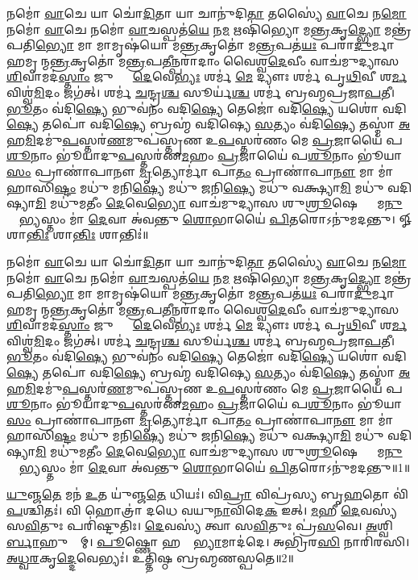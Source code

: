 \setcounter{anuvakam}{0}
𑌨𑌮𑍋॑ \ul{𑌵𑌾}𑌚𑍇 𑌯𑌾 𑌚𑍋॑\ul{𑌦𑌿}𑌤𑌾 𑌯𑌾 𑌚𑌾𑌨𑍁॑𑌦𑌿\ul{𑌤𑌾} 𑌤𑌸𑍍𑌯𑍈॑ \ul{𑌵𑌾}𑌚𑍇 𑌨\ul{𑌮𑍋} 𑌨𑌮𑍋॑ \ul{𑌵𑌾}𑌚𑍇 𑌨𑌮𑍋॑ \ul{𑌵𑌾}𑌚𑌸𑍍𑌪𑌤॑\ul{𑌯𑍇} 𑌨\ul{𑌮} 𑌋𑌷𑌿॑𑌭𑍍𑌯𑍋 𑌮\ul{𑌨𑍍𑌤𑍍𑌰}𑌕𑍃\ul{𑌦𑍍𑌭𑍍𑌯𑍋} 𑌮𑌨𑍍𑌤𑍍𑌰॑𑌪𑌤𑌿\ul{𑌭𑍍𑌯𑍋} 𑌮𑌾 𑌮𑌾𑌮𑍃𑌷॑𑌯𑍋 𑌮\ul{𑌨𑍍𑌤𑍍𑌰}𑌕𑍃𑌤𑍋॑ 𑌮\ul{𑌨𑍍𑌤𑍍𑌰}𑌪𑌤॑\ul{𑌯𑌃} 𑌪𑌰𑌾॑\ul{𑌦𑍁}𑌰𑍍𑌮𑌾𑌹𑌮𑍃𑌷𑍀᳚𑌨𑍍𑌮\ul{𑌨𑍍𑌤𑍍𑌰}𑌕𑍃𑌤𑍋॑ 𑌮\ul{𑌨𑍍𑌤𑍍𑌰}𑌪\ul{𑌤𑍀}𑌨𑍍𑌪𑌰𑌾॑𑌦𑌾𑌂 𑌵𑍈𑌶𑍍𑌵\ul{𑌦𑍇}𑌵𑍀𑌂 𑌵𑌾𑌚॑𑌮𑍁𑌦𑍍𑌯𑌾𑌸 \ul{𑌶𑌿}𑌵𑌾𑌮𑌦॑\ul{𑌸𑍍𑌤𑌾𑌂} 𑌜𑍁𑌷𑍍𑌟𑌾𑌂᳚ \ul{𑌦𑍇}𑌵𑍇\ul{𑌭𑍍𑌯𑌃} 𑌶𑌰𑍍𑌮॑ \ul{𑌮𑍇} 𑌦𑍍𑌯𑍗𑌃  𑌶𑌰𑍍𑌮॑ 𑌪𑍃\ul{𑌥𑌿}𑌵𑍀 𑌶\ul{𑌰𑍍𑌮} 𑌵𑌿𑌶𑍍𑌵॑\ul{𑌮𑌿}𑌦𑌂 𑌜𑌗॑𑌤𑍍। 
𑌶𑌰𑍍𑌮॑ \ul{𑌚}𑌨𑍍𑌦𑍍𑌰\ul{𑌶𑍍𑌚} 𑌸𑍂𑌰𑍍𑌯॑\ul{𑌶𑍍𑌚} 𑌶𑌰𑍍𑌮॑ 𑌬𑍍𑌰𑌹𑍍𑌮𑌪𑍍𑌰𑌜𑌾\ul{𑌪}𑌤𑍀। 
\ul{𑌭𑍂}𑌤𑌂 𑌵॑𑌦𑌿\ul{𑌷𑍍𑌯𑍇} 𑌭𑍁𑌵॑𑌨𑌂 𑌵𑌦𑌿\ul{𑌷𑍍𑌯𑍇} 𑌤𑍇𑌜𑍋॑ 𑌵𑌦𑌿\ul{𑌷𑍍𑌯𑍇} 𑌯𑌶𑍋॑ 𑌵𑌦𑌿\ul{𑌷𑍍𑌯𑍇} 𑌤𑌪𑍋॑ 𑌵𑌦𑌿\ul{𑌷𑍍𑌯𑍇} 𑌬𑍍𑌰𑌹𑍍𑌮॑ 𑌵𑌦𑌿𑌷𑍍𑌯𑍇 \ul{𑌸}𑌤𑍍𑌯𑌂 𑌵॑𑌦𑌿\ul{𑌷𑍍𑌯𑍇} 𑌤𑌸𑍍𑌮𑌾॑ \ul{𑌅}𑌹\ul{𑌮𑌿}𑌦𑌮𑍁॑\ul{𑌪}𑌸𑍍𑌤𑌰॑\ul{𑌣}𑌮𑍁𑌪॑𑌸𑍍𑌤𑍃𑌣 𑌉\ul{𑌪}𑌸𑍍𑌤𑌰॑𑌣𑌂 𑌮𑍇 \ul{𑌪𑍍𑌰}𑌜𑌾𑌯𑍈॑ 𑌪\ul{𑌶𑍂}𑌨𑌾𑌂 𑌭𑍂॑𑌯𑌾𑌦𑍁\ul{𑌪}𑌸𑍍𑌤𑌰॑𑌣\ul{𑌮}𑌹𑌂 \ul{𑌪𑍍𑌰}𑌜𑌾𑌯𑍈॑ 𑌪\ul{𑌶𑍂}𑌨𑌾𑌂 𑌭𑍂॑𑌯𑌾\ul{𑌸𑌂} 𑌪𑍍𑌰𑌾𑌣𑌾॑𑌪𑌾𑌨𑍗 \ul{𑌮𑍃}𑌤𑍍𑌯𑍋𑌰𑍍𑌮𑌾॑ 𑌪𑌾\ul{𑌤𑌂} 𑌪𑍍𑌰𑌾𑌣𑌾॑𑌪𑌾\ul{𑌨𑍗} 𑌮𑌾 𑌮𑌾॑ 𑌹𑌾𑌸𑌿\ul{𑌷𑍍𑌟𑌂} 𑌮𑌧𑍁॑ 𑌮𑌨𑌿\ul{𑌷𑍍𑌯𑍇} 𑌮𑌧𑍁॑ 𑌜𑌨𑌿\ul{𑌷𑍍𑌯𑍇} 𑌮𑌧𑍁॑ 𑌵𑌕𑍍𑌷𑍍𑌯𑌾\ul{𑌮𑌿} 𑌮𑌧𑍁॑ 𑌵𑌦𑌿𑌷𑍍𑌯𑌾\ul{𑌮𑌿} 𑌮𑌧𑍁॑𑌮𑌤𑍀𑌂 \ul{𑌦𑍇}𑌵𑍇\ul{𑌭𑍍𑌯𑍋} 𑌵𑌾𑌚॑𑌮𑍁𑌦𑍍𑌯𑌾𑌸 𑌶𑍁\ul{𑌶𑍍𑌰𑍂}𑌷𑍇𑌣𑍍𑌯𑌾𑌂᳚ 𑌮\ul{𑌨𑍁}𑌷𑍍𑌯𑍇᳚\ul{𑌭𑍍𑌯}𑌸𑍍𑌤𑌂 𑌮𑌾॑ \ul{𑌦𑍇}𑌵𑌾 𑌅॑𑌵𑌨𑍍𑌤𑍁 \ul{𑌶𑍋}𑌭𑌾𑌯𑍈॑ \ul{𑌪𑌿}𑌤𑌰𑍋𑌽𑌨𑍁॑𑌮𑌦𑌨𑍍𑌤𑍁। 
𑍐 𑌶𑌾\ul{𑌨𑍍𑌤𑌿𑌃} 𑌶𑌾\ul{𑌨𑍍𑌤𑌿𑌃} 𑌶𑌾𑌨𑍍𑌤𑌿𑌃॑॥ 

𑌨𑌮𑍋॑ \ul{𑌵𑌾}𑌚𑍇 𑌯𑌾 𑌚𑍋॑\ul{𑌦𑌿}𑌤𑌾 𑌯𑌾 𑌚𑌾𑌨𑍁॑𑌦𑌿\ul{𑌤𑌾} 𑌤𑌸𑍍𑌯𑍈॑ \ul{𑌵𑌾}𑌚𑍇 𑌨\ul{𑌮𑍋} 𑌨𑌮𑍋॑ \ul{𑌵𑌾}𑌚𑍇 𑌨𑌮𑍋॑ \ul{𑌵𑌾}𑌚𑌸𑍍𑌪𑌤॑\ul{𑌯𑍇} 𑌨\ul{𑌮} 𑌋𑌷𑌿॑𑌭𑍍𑌯𑍋 𑌮\ul{𑌨𑍍𑌤𑍍𑌰}𑌕𑍃\ul{𑌦𑍍𑌭𑍍𑌯𑍋} 𑌮𑌨𑍍𑌤𑍍𑌰॑𑌪𑌤𑌿\ul{𑌭𑍍𑌯𑍋} 𑌮𑌾 𑌮𑌾𑌮𑍃𑌷॑𑌯𑍋 𑌮\ul{𑌨𑍍𑌤𑍍𑌰}𑌕𑍃𑌤𑍋॑ 𑌮\ul{𑌨𑍍𑌤𑍍𑌰}𑌪𑌤॑\ul{𑌯𑌃} 𑌪𑌰𑌾॑\ul{𑌦𑍁}𑌰𑍍𑌮𑌾𑌹𑌮𑍃𑌷𑍀᳚𑌨𑍍𑌮\ul{𑌨𑍍𑌤𑍍𑌰}𑌕𑍃𑌤𑍋॑ 𑌮\ul{𑌨𑍍𑌤𑍍𑌰}𑌪\ul{𑌤𑍀}𑌨𑍍𑌪𑌰𑌾॑𑌦𑌾𑌂 𑌵𑍈𑌶𑍍𑌵\ul{𑌦𑍇}𑌵𑍀𑌂 𑌵𑌾𑌚॑𑌮𑍁𑌦𑍍𑌯𑌾𑌸 \ul{𑌶𑌿}𑌵𑌾𑌮𑌦॑\ul{𑌸𑍍𑌤𑌾𑌂} 𑌜𑍁𑌷𑍍𑌟𑌾𑌂᳚ \ul{𑌦𑍇}𑌵𑍇\ul{𑌭𑍍𑌯𑌃} 𑌶𑌰𑍍𑌮॑ \ul{𑌮𑍇} 𑌦𑍍𑌯𑍗𑌃  𑌶𑌰𑍍𑌮॑ 𑌪𑍃\ul{𑌥𑌿}𑌵𑍀 𑌶\ul{𑌰𑍍𑌮} 𑌵𑌿𑌶𑍍𑌵॑\ul{𑌮𑌿}𑌦𑌂 𑌜𑌗॑𑌤𑍍। 
𑌶𑌰𑍍𑌮॑ \ul{𑌚}𑌨𑍍𑌦𑍍𑌰\ul{𑌶𑍍𑌚} 𑌸𑍂𑌰𑍍𑌯॑\ul{𑌶𑍍𑌚} 𑌶𑌰𑍍𑌮॑ 𑌬𑍍𑌰𑌹𑍍𑌮𑌪𑍍𑌰𑌜𑌾\ul{𑌪}𑌤𑍀। 
\ul{𑌭𑍂}𑌤𑌂 𑌵॑𑌦𑌿\ul{𑌷𑍍𑌯𑍇} 𑌭𑍁𑌵॑𑌨𑌂 𑌵𑌦𑌿\ul{𑌷𑍍𑌯𑍇} 𑌤𑍇𑌜𑍋॑ 𑌵𑌦𑌿\ul{𑌷𑍍𑌯𑍇} 𑌯𑌶𑍋॑ 𑌵𑌦𑌿\ul{𑌷𑍍𑌯𑍇} 𑌤𑌪𑍋॑ 𑌵𑌦𑌿\ul{𑌷𑍍𑌯𑍇} 𑌬𑍍𑌰𑌹𑍍𑌮॑ 𑌵𑌦𑌿𑌷𑍍𑌯𑍇 \ul{𑌸}𑌤𑍍𑌯𑌂 𑌵॑𑌦𑌿\ul{𑌷𑍍𑌯𑍇} 𑌤𑌸𑍍𑌮𑌾॑ \ul{𑌅}𑌹\ul{𑌮𑌿}𑌦𑌮𑍁॑\ul{𑌪}𑌸𑍍𑌤𑌰॑\ul{𑌣}𑌮𑍁𑌪॑𑌸𑍍𑌤𑍃𑌣 𑌉\ul{𑌪}𑌸𑍍𑌤𑌰॑𑌣𑌂 𑌮𑍇 \ul{𑌪𑍍𑌰}𑌜𑌾𑌯𑍈॑ 𑌪\ul{𑌶𑍂}𑌨𑌾𑌂 𑌭𑍂॑𑌯𑌾𑌦𑍁\ul{𑌪}𑌸𑍍𑌤𑌰॑𑌣\ul{𑌮}𑌹𑌂 \ul{𑌪𑍍𑌰}𑌜𑌾𑌯𑍈॑ 𑌪\ul{𑌶𑍂}𑌨𑌾𑌂 𑌭𑍂॑𑌯𑌾\ul{𑌸𑌂} 𑌪𑍍𑌰𑌾𑌣𑌾॑𑌪𑌾𑌨𑍗 \ul{𑌮𑍃}𑌤𑍍𑌯𑍋𑌰𑍍𑌮𑌾॑ 𑌪𑌾\ul{𑌤𑌂} 𑌪𑍍𑌰𑌾𑌣𑌾॑𑌪𑌾\ul{𑌨𑍗} 𑌮𑌾 𑌮𑌾॑ 𑌹𑌾𑌸𑌿\ul{𑌷𑍍𑌟𑌂} 𑌮𑌧𑍁॑ 𑌮𑌨𑌿\ul{𑌷𑍍𑌯𑍇} 𑌮𑌧𑍁॑ 𑌜𑌨𑌿\ul{𑌷𑍍𑌯𑍇} 𑌮𑌧𑍁॑ 𑌵𑌕𑍍𑌷𑍍𑌯𑌾\ul{𑌮𑌿} 𑌮𑌧𑍁॑ 𑌵𑌦𑌿𑌷𑍍𑌯𑌾\ul{𑌮𑌿} 𑌮𑌧𑍁॑𑌮𑌤𑍀𑌂 \ul{𑌦𑍇}𑌵𑍇\ul{𑌭𑍍𑌯𑍋} 𑌵𑌾𑌚॑𑌮𑍁𑌦𑍍𑌯𑌾𑌸 𑌶𑍁\ul{𑌶𑍍𑌰𑍂}𑌷𑍇𑌣𑍍𑌯𑌾𑌂᳚ 𑌮\ul{𑌨𑍁}𑌷𑍍𑌯𑍇᳚\ul{𑌭𑍍𑌯}𑌸𑍍𑌤𑌂 𑌮𑌾॑ \ul{𑌦𑍇}𑌵𑌾 𑌅॑𑌵𑌨𑍍𑌤𑍁 \ul{𑌶𑍋}𑌭𑌾𑌯𑍈॑ \ul{𑌪𑌿}𑌤𑌰𑍋𑌽𑌨𑍁॑𑌮𑌦𑌨𑍍𑌤𑍁॥1॥\anuvakamend

\ul{𑌯𑍁}𑌞𑍍𑌜\ul{𑌤𑍇} 𑌮𑌨॑ \ul{𑌉}𑌤 𑌯𑍁॑𑌞𑍍𑌜\ul{𑌤𑍇} 𑌧𑌿𑌯𑌃॑। 
𑌵𑌿\ul{𑌪𑍍𑌰𑌾} 𑌵𑌿𑌪𑍍𑌰॑𑌸𑍍𑌯 𑌬𑍃\ul{𑌹}𑌤𑍋 𑌵𑌿॑\ul{𑌪}𑌶𑍍𑌚𑌿𑌤𑌃॑। 
𑌵𑌿 𑌹𑍋𑌤𑍍𑌰𑌾॑ 𑌦𑌧𑍇 𑌵𑌯𑍁\ul{𑌨𑌾}𑌵𑌿𑌦𑍇\ul{𑌕} 𑌇𑌤𑍍। 
\ul{𑌮}𑌹𑍀 \ul{𑌦𑍇}𑌵𑌸𑍍𑌯॑ 𑌸\ul{𑌵𑌿}𑌤𑍁𑌃 𑌪𑌰𑌿॑𑌷𑍍𑌟𑍁𑌤𑌿𑌃। 
\ul{𑌦𑍇}𑌵𑌸𑍍𑌯॑ 𑌤𑍍𑌵𑌾 𑌸\ul{𑌵𑌿}𑌤𑍁𑌃 𑌪𑍍𑌰॑\ul{𑌸}𑌵𑍇। 
\ul{𑌅}𑌶𑍍𑌵𑌿𑌨𑍋᳚\ul{𑌰𑍍𑌬𑌾}𑌹𑍁𑌭𑍍𑌯𑌾᳚𑌮𑍍। 
\ul{𑌪𑍂}𑌷𑍍𑌣𑍋 𑌹𑌸𑍍𑌤𑌾᳚\ul{𑌭𑍍𑌯𑌾}𑌮𑌾𑌦॑𑌦𑍇। 
𑌅𑌭𑍍𑌰𑌿॑𑌰\ul{𑌸𑌿} 𑌨𑌾𑌰𑌿॑𑌰𑌸𑌿। 
\ul{𑌅}\ul{𑌧𑍍𑌵}\ul{𑌰}𑌕𑍃\ul{𑌦𑍍𑌦𑍇}𑌵𑍇𑌭𑍍𑌯𑌃॑। 
𑌉𑌤𑍍𑌤𑌿॑𑌷𑍍𑌠 𑌬𑍍𑌰𑌹𑍍𑌮𑌣𑌸𑍍𑌪𑌤𑍇॥2॥

